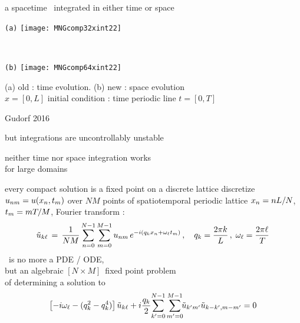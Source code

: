 \begin{frame}{a spacetime \twot\ integrated in either time or space}
\begin{center}
  \begin{minipage}[height=.40\textheight]{.35\textwidth}
    \centering \small{\texttt{(a)}}
    \texttt{[image: MNGcomp32xint22]}
  \end{minipage}
~~~~~~~~~
  \begin{minipage}[height=.40\textheight]{.35\textwidth}
    \centering \small{\texttt{(b)}}
    \texttt{[image: MNGcomp64xint22]}
  \end{minipage}
\end{center}
    (a) old : time evolution. (b) new : space evolution
    \\
    $x=[0,L]$ %
       initial condition : time periodic line $t = [0,T]$

\vfill\hfill        Gudorf 2016
\end{frame}

\begin{frame}{but integrations are uncontrollably unstable}
\begin{center}
{\huge neither} time {\huge nor} space integration {\huge works} \\
for large domains
\end{center}

\vfill
\color{red}{rethink the calculation}
\end{frame}


\begin{frame}{every compact solution is a fixed point on a discrete lattice}
discretize $u_{nm} = u(x_n,t_m)$ over
$N M$ points of spatiotemporal periodic lattice $x_n = n L/N$,
 $t_m = m {T_{}}/M$, Fourier transform :
%
\[
\tilde{u}_{k\ell} \,=\,
  \frac{1}{NM} \sum^{N-1}_{n=0} \sum^{M-1}_{m=0}
  u_{nm} \, e^{-i(q_kx_n + \omega_\ell t_m)}
    \,,\quad
q_k = \frac{2 \pi k}{L}
    \,,\;
\omega_\ell = \frac{2 \pi \ell}{{T_{}}}
\]
\KS\ is no more a PDE / ODE, \\
but an algebraic $[N\!\times\!M]$\dmn\ fixed point problem \\
of determining a solution to
\[
\left[- i \omega_\ell - ( q_k^2 - q_k^4 ) \right]\tilde{u}_{k\ell}
+ i \frac{q_k}{2} \!\sum_{k'=0}^{N-1} \sum^{M-1}_{m'=0}\!\!
\tilde{u}_{k'm'} \tilde{u}_{k-k',m-m'}
    =
0
\]
\end{frame}

